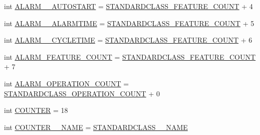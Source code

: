 \begin{DoxyCompactItemize}
\item 
int \hyperlink{interfaceshootingmachineemfmodel_1_1_shootingmachineemfmodel_package_a0edfc49ad0b13db0ade229866f2b9b2a}{A\-L\-A\-R\-M\-\_\-\-\_\-\-A\-U\-T\-O\-S\-T\-A\-R\-T} = \hyperlink{interfaceshootingmachineemfmodel_1_1_shootingmachineemfmodel_package_a14037f66989b3107e402142df96ee9aa}{S\-T\-A\-N\-D\-A\-R\-D\-C\-L\-A\-S\-S\-\_\-\-F\-E\-A\-T\-U\-R\-E\-\_\-\-C\-O\-U\-N\-T} + 4
\item 
int \hyperlink{interfaceshootingmachineemfmodel_1_1_shootingmachineemfmodel_package_ac5eb3c5a5b86a0035eaf0b1d873ada39}{A\-L\-A\-R\-M\-\_\-\-\_\-\-A\-L\-A\-R\-M\-T\-I\-M\-E} = \hyperlink{interfaceshootingmachineemfmodel_1_1_shootingmachineemfmodel_package_a14037f66989b3107e402142df96ee9aa}{S\-T\-A\-N\-D\-A\-R\-D\-C\-L\-A\-S\-S\-\_\-\-F\-E\-A\-T\-U\-R\-E\-\_\-\-C\-O\-U\-N\-T} + 5
\item 
int \hyperlink{interfaceshootingmachineemfmodel_1_1_shootingmachineemfmodel_package_a0ab335e15d518650cd47ece0bf137051}{A\-L\-A\-R\-M\-\_\-\-\_\-\-C\-Y\-C\-L\-E\-T\-I\-M\-E} = \hyperlink{interfaceshootingmachineemfmodel_1_1_shootingmachineemfmodel_package_a14037f66989b3107e402142df96ee9aa}{S\-T\-A\-N\-D\-A\-R\-D\-C\-L\-A\-S\-S\-\_\-\-F\-E\-A\-T\-U\-R\-E\-\_\-\-C\-O\-U\-N\-T} + 6
\item 
int \hyperlink{interfaceshootingmachineemfmodel_1_1_shootingmachineemfmodel_package_a4236d01c86578b67309fd2839b61148c}{A\-L\-A\-R\-M\-\_\-\-F\-E\-A\-T\-U\-R\-E\-\_\-\-C\-O\-U\-N\-T} = \hyperlink{interfaceshootingmachineemfmodel_1_1_shootingmachineemfmodel_package_a14037f66989b3107e402142df96ee9aa}{S\-T\-A\-N\-D\-A\-R\-D\-C\-L\-A\-S\-S\-\_\-\-F\-E\-A\-T\-U\-R\-E\-\_\-\-C\-O\-U\-N\-T} + 7
\item 
int \hyperlink{interfaceshootingmachineemfmodel_1_1_shootingmachineemfmodel_package_a4abb13fde140669afe6ee64c769d6431}{A\-L\-A\-R\-M\-\_\-\-O\-P\-E\-R\-A\-T\-I\-O\-N\-\_\-\-C\-O\-U\-N\-T} = \hyperlink{interfaceshootingmachineemfmodel_1_1_shootingmachineemfmodel_package_a2fe5d848cfe0a02fe5609e2c5ed7e7c7}{S\-T\-A\-N\-D\-A\-R\-D\-C\-L\-A\-S\-S\-\_\-\-O\-P\-E\-R\-A\-T\-I\-O\-N\-\_\-\-C\-O\-U\-N\-T} + 0
\item 
int \hyperlink{interfaceshootingmachineemfmodel_1_1_shootingmachineemfmodel_package_a94a2492dc6388aaef55a19944ca34c22}{C\-O\-U\-N\-T\-E\-R} = 18
\item 
int \hyperlink{interfaceshootingmachineemfmodel_1_1_shootingmachineemfmodel_package_abd20c8612d23ade7b29ea8f3e5be6d60}{C\-O\-U\-N\-T\-E\-R\-\_\-\-\_\-\-N\-A\-M\-E} = \hyperlink{interfaceshootingmachineemfmodel_1_1_shootingmachineemfmodel_package_a06475d7d54d52ee19b2aaf4d5d73c738}{S\-T\-A\-N\-D\-A\-R\-D\-C\-L\-A\-S\-S\-\_\-\-\_\-\-N\-A\-M\-E}

\end{DoxyCompactItemize}
